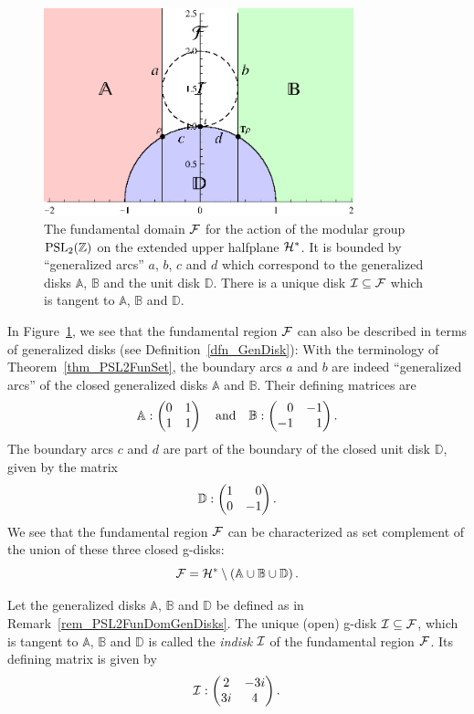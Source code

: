 \begin{remark}
\label{rem_PSL2FunDomGenDisks}
\begin{figure}
\centering
\includegraphics[width=0.8\textwidth]{figures/fundom}
\caption{The fundamental domain $\mathcal{F}$ for the action of the modular group $\operatorname{PSL}_{2}(\mathbb{Z})$ on the extended upper halfplane $\mathcal{H}^\ast$. It is bounded by ``generalized arcs'' $a$, $b$, $c$ and $d$ which correspond to the generalized disks $\mathbb{A}$, $\mathbb{B}$ and the unit disk $\mathbb{D}$. There is a unique disk $\mathcal{I} \subseteq \mathcal{F}$ which is tangent to $\mathbb{A}$, $\mathbb{B}$ and $\mathbb{D}$.}
\label{fig_PSL2FunDom}
\end{figure}
In Figure~\ref{fig_PSL2FunDom}, we see that the fundamental region $\mathcal{F}$ can also be described in terms of generalized disks (see Definition~\ref{dfn_GenDisk}): With the terminology of Theorem~\ref{thm_PSL2FunSet}, the boundary arcs $a$ and $b$ are indeed ``generalized arcs'' of the closed generalized disks $\mathbb{A}$ and $\mathbb{B}$. Their defining matrices are
\begin{equation*}
\mathbb{A} : \begin{pmatrix}0 & 1 \\ 1 & 1\end{pmatrix} \quad \text{and} \quad 
\mathbb{B} : \begin{pmatrix}\phantom{+}0 & -1 \\ -1 & \phantom{+}1\end{pmatrix}.
\end{equation*}
The boundary arcs $c$ and $d$ are part of the boundary of the closed unit disk $\mathbb{D}$, given by the matrix
\begin{equation*}
\mathbb{D} : \begin{pmatrix}1 & \phantom{+}0 \\ 0 & -1\end{pmatrix}.
\end{equation*}
We see that the fundamental region $\mathcal{F}$ can be characterized as set complement of the union of these three closed g-disks:
\begin{equation}
\label{eqn_PSL2FunDomDiskComplement}
\mathcal{F} = \mathcal{H}^\ast \setminus \left(\mathbb{A} \cup \mathbb{B} \cup \mathbb{D}\right).
\end{equation}
\end{remark}

\begin{definition}
\label{dfn_PSL2Indisk}
Let the generalized disks $\mathbb{A}$, $\mathbb{B}$ and $\mathbb{D}$ be defined as in Remark~\ref{rem_PSL2FunDomGenDisks}. The unique (open) g-disk $\mathcal{I} \subseteq \mathcal{F}$, which is tangent to $\mathbb{A}$, $\mathbb{B}$ and $\mathbb{D}$ is called the \emph{indisk} $\mathcal{I}$ of the fundamental region $\mathcal{F}$. Its defining matrix is given by
\begin{equation}
\label{eqn_PSL2Indisk}
\mathcal{I} : \begin{pmatrix}2 & -3i \\ 3i & 4\end{pmatrix}.
\end{equation}
\end{definition}
